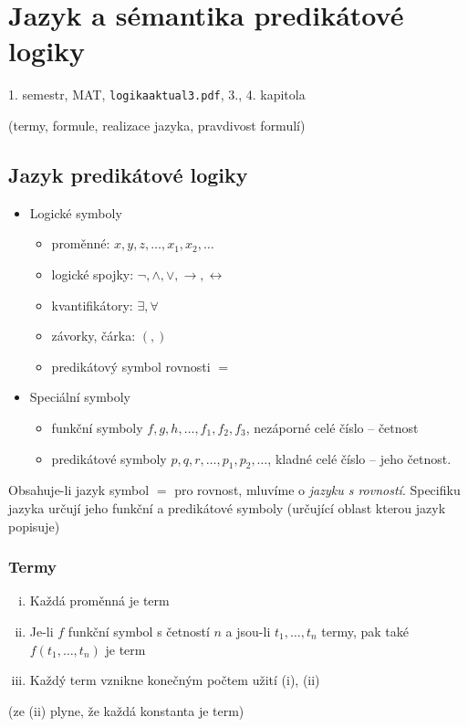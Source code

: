 \documentclass[a4paper, 11pt]{report}
\begin{document}
\chapter{Jazyk a sémantika predikátové logiky} \label{cha:6}
1. semestr, MAT, \texttt{logikaaktual3.pdf}, 3., 4. kapitola

(termy, formule, realizace jazyka, pravdivost formulí)

\section{Jazyk predikátové logiky}

\begin{itemize}
	\item Logické symboly
	\begin{itemize}
		\item proměnné: $x, y, z, \dots, x_1, x_2, \dots$
		\item logické spojky: $ \lnot, \land, \lor, \to, \leftrightarrow$
		\item kvantifikátory: $\exists, \forall$
		\item závorky, čárka: $(,)$
		\item predikátový symbol rovnosti $=$
	\end{itemize}
	\item Speciální symboly
	\begin{itemize}
		\item funkční symboly $f, g, h, \dots, f_1, f_2, f_3$, nezáporné celé číslo -- četnost
		\item predikátové symboly $p, q, r, \dots, p_1, p_2, \dots$, kladné celé číslo -- jeho četnost.
	\end{itemize}
\end{itemize}

Obsahuje-li jazyk symbol $=$ pro rovnost, mluvíme o \emph{jazyku s rovností}.
Specifiku jazyka určují jeho funkční a predikátové symboly (určující oblast kterou jazyk popisuje)

\subsection{Termy}
\begin{enumerate}[(i)]
	\item Každá proměnná je term
	\item Je-li $f$ funkční symbol s četností $n$ a jsou-li $t_1, \dots, t_n$ termy, pak také $f(t_1, \dots, t_n)$ je term
	\item Každý term vznikne konečným počtem užití (i), (ii)
\end{enumerate}
(ze (ii) plyne, že každá konstanta je term)
\end{document}
